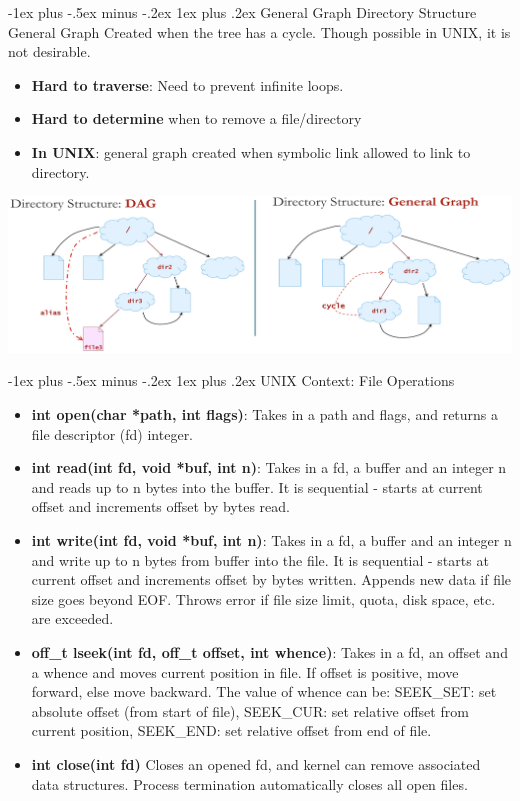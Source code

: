 \documentclass[10pt, landscape]{article}
\makeatletter
\renewcommand{\subsubsection}{\@startsection{subsubsection}{3}{0mm}%
                                {-1ex plus -.5ex minus -.2ex}%
                                {1ex plus .2ex}%
                                {\normalfont\small\bfseries}}
\makeatother
\begin{document}
\begin{multicols*}{3}
\subsubsection{General Graph Directory Structure}
General Graph Created when the tree has a cycle. Though possible in
UNIX, it is not desirable.
\begin{itemize}
\item \textbf{Hard to traverse}: Need to prevent infinite loops.
\item \textbf{Hard to determine} when to remove a file/directory
\item \textbf{In UNIX}: general graph created when symbolic link allowed to link to directory.
\end{itemize}

\centerline{\includegraphics[width=1\linewidth]{directoryStructure}}

\subsubsection{UNIX Context: File Operations}
\begin{itemize}
\item \textbf{int open(char *path, int flags)}: Takes in a path and flags, and returns a file descriptor
(fd) integer.
\item \textbf{int read(int fd, void *buf, int n)}: Takes in a fd, a buffer and an integer n and reads up
to n bytes into the buffer. It is sequential - starts at current offset and increments offset by bytes read.
\item \textbf{int write(int fd, void *buf, int n)}: Takes in a fd, a buffer and an integer n and write up to
n bytes from buffer into the file. It is sequential - starts at current offset and increments offset by bytes written. Appends new data if file size goes beyond EOF. Throws error if file size limit, quota, disk space, etc.
are exceeded.
\item \textbf{off\_t lseek(int fd, off\_t offset, int whence)}: Takes in a fd, an offset and a whence and moves current position in file. If offset is positive, move forward, else move backward. The value of whence can be: SEEK\_SET: set absolute offset (from start of file), SEEK\_CUR: set relative offset from current position, SEEK\_END: set relative offset from end of file.
\item \textbf{int close(int fd)} Closes an opened fd, and kernel can remove associated data structures. Process termination automatically closes all open files.
\end{itemize}


\end{multicols*}
\end{document}

